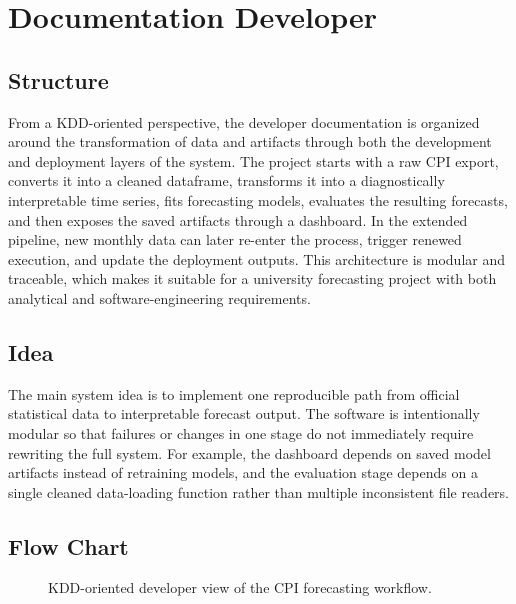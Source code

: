 %
%
%

\chapter{Documentation Developer}
\label{ch:documentation-developer}

\section{Structure}

From a KDD-oriented perspective, the developer documentation is organized around the transformation of data and artifacts through both the development and deployment layers of the system. The project starts with a raw CPI export, converts it into a cleaned dataframe, transforms it into a diagnostically interpretable time series, fits forecasting models, evaluates the resulting forecasts, and then exposes the saved artifacts through a dashboard. In the extended pipeline, new monthly data can later re-enter the process, trigger renewed execution, and update the deployment outputs. This architecture is modular and traceable, which makes it suitable for a university forecasting project with both analytical and software-engineering requirements.

\section{Idea}

The main system idea is to implement one reproducible path from official statistical data to interpretable forecast output. The software is intentionally modular so that failures or changes in one stage do not immediately require rewriting the full system. For example, the dashboard depends on saved model artifacts instead of retraining models, and the evaluation stage depends on a single cleaned data-loading function rather than multiple inconsistent file readers.

\section{Flow Chart}

\begin{figure}[htbp]
    \centering
    
    \caption{KDD-oriented developer view of the CPI forecasting workflow.}
    \label{fig:docdev-flowchart}
\end{figure}

